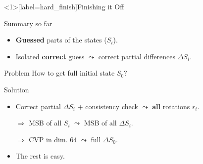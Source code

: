 



\begin{frame}<1>[label=hard_finish]{Finishing it Off}

  \begin{block}{Summary so far}
    \begin{itemize}
    \item \textbf{Guessed} parts of the states ($S_i$).
    \item Isolated \textbf{correct} guess $\leadsto$ correct partial differences $\Delta S_i$.
    \end{itemize}
  \end{block}

  \bigskip

  \begin{alertblock}{Problem}
    How to get full initial state $S_0$?
  \end{alertblock}

  \bigskip
  \pause

  \begin{exampleblock}{Solution}
    \begin{itemize}
    \item Correct partial $\Delta S_i$ + consistency check $\leadsto$ \textbf{all} rotations $r_i$.
    \item[$\Rightarrow$] MSB of all $S_i$ $\leadsto$ MSB of all $\Delta S_i$.
    \item[$\Rightarrow$] CVP in dim. 64 $\leadsto$ full $\Delta S_0$.
      \pause
    \item The rest is easy.
    \end{itemize}
  \end{exampleblock}
\end{frame}


